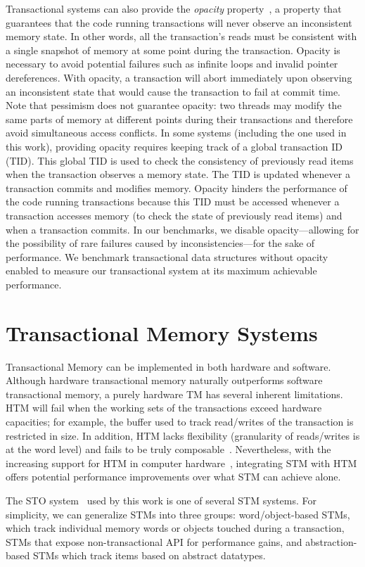 Transactional systems can also provide the \emph{opacity} property~\cite{opacity}, a property that guarantees that the code running transactions will never observe an inconsistent memory state. 
In other words, all the transaction's reads must be consistent with a single snapshot of memory at some point during the transaction.
Opacity is necessary to avoid potential failures such as infinite loops and invalid pointer dereferences. With opacity, a transaction will abort immediately upon observing an inconsistent state that would cause the transaction to fail at commit time. Note that pessimism does not guarantee opacity: two threads may modify the same parts of memory at different points during their transactions and therefore avoid simultaneous access conflicts.
In some systems (including the one used in this work), providing opacity requires keeping track of a global transaction ID (TID). This global TID is used to check the consistency of previously read items when the transaction observes a memory state. The TID is updated whenever a transaction commits and modifies memory. Opacity hinders the performance of the code running transactions because this TID must be accessed whenever a transaction accesses memory (to check the state of previously read items) and when a transaction commits. In our benchmarks, we disable opacity---allowing for the possibility of rare failures caused by inconsistencies---for the sake of performance. We benchmark transactional data structures without opacity enabled to measure our transactional system at its maximum achievable performance.

\section{Transactional Memory Systems}
Transactional Memory can be implemented in both hardware and software. Although hardware transactional memory naturally outperforms software transactional memory, a purely hardware TM has several inherent limitations. HTM will fail when the working sets of the transactions exceed hardware capacities; for example, the buffer used to track read/writes of the transaction is restricted in size. In addition, HTM lacks flexibility (granularity of reads/writes is at the word level) and fails to be truly composable~\cite{htm}. Nevertheless, with the increasing support for HTM in computer hardware~\cite{intel_htm}, integrating STM with HTM offers potential performance improvements over what STM can achieve alone.

The STO system~\cite{sto} used by this work is one of several STM systems. For simplicity, we can generalize STMs into three groups: word/object-based STMs, which track individual memory words or objects touched during a transaction, STMs that expose non-transactional API for performance gains, and abstraction-based STMs which track items based on abstract datatypes.


